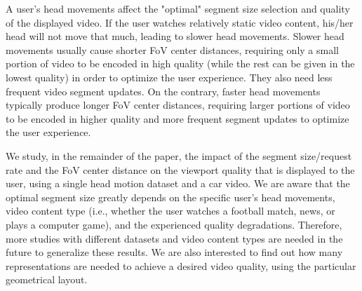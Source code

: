  A user's head movements affect the "optimal" segment size selection and quality of the displayed video. If the user watches relatively static video content, his/her head will not move that much, leading to slower head movements. Slower head movements usually cause shorter FoV center distances, requiring only a small portion of video to be encoded in high quality (while the rest can be given in the lowest quality) in order to optimize the user experience. They also need less frequent video segment updates. On the contrary, faster head movements typically produce longer FoV center distances,  requiring larger portions of video to be encoded in higher quality and more frequent segment updates to optimize the user experience.

We study, in the remainder of the paper, the impact of the segment size/request rate and the FoV center distance on the viewport quality that is displayed to the user, using a single head motion dataset and a car video. We are aware that the optimal segment size greatly depends on the specific user's head movements, video content type (i.e., whether the user watches a football match, news, or plays a computer game), and the experienced quality degradations. Therefore, more studies with different datasets and video content types are needed in the future to generalize these results. We are also interested to find out how many representations are needed to achieve a desired video quality, using the particular geometrical layout.
